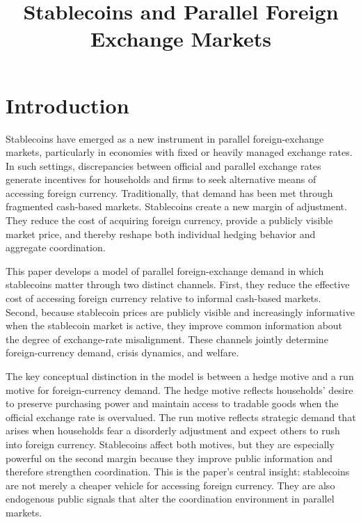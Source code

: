 \documentclass[12pt]{article}
\title{Stablecoins and Parallel Foreign Exchange Markets}
\author{}
\date{}
\begin{document}
\maketitle

\section{Introduction}

Stablecoins have emerged as a new instrument in parallel foreign-exchange markets, particularly in economies with fixed or heavily managed exchange rates. In such settings, discrepancies between official and parallel exchange rates generate incentives for households and firms to seek alternative means of accessing foreign currency. Traditionally, that demand has been met through fragmented cash-based markets. Stablecoins create a new margin of adjustment. They reduce the cost of acquiring foreign currency, provide a publicly visible market price, and thereby reshape both individual hedging behavior and aggregate coordination.

This paper develops a model of parallel foreign-exchange demand in which stablecoins matter through two distinct channels. First, they reduce the effective cost of accessing foreign currency relative to informal cash-based markets. Second, because stablecoin prices are publicly visible and increasingly informative when the stablecoin market is active, they improve common information about the degree of exchange-rate misalignment. These channels jointly determine foreign-currency demand, crisis dynamics, and welfare.

The key conceptual distinction in the model is between a hedge motive and a run motive for foreign-currency demand. The hedge motive reflects households' desire to preserve purchasing power and maintain access to tradable goods when the official exchange rate is overvalued. The run motive reflects strategic demand that arises when households fear a disorderly adjustment and expect others to rush into foreign currency. Stablecoins affect both motives, but they are especially powerful on the second margin because they improve public information and therefore strengthen coordination. This is the paper's central insight: stablecoins are not merely a cheaper vehicle for accessing foreign currency. They are also endogenous public signals that alter the coordination environment in parallel markets.
\end{document}
